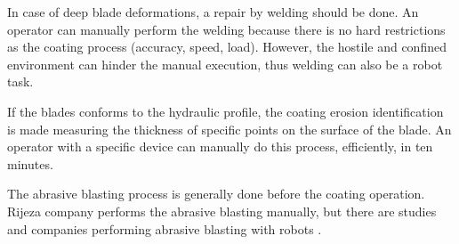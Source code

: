 In case of deep blade deformations, %
a repair by welding should be done. %
An operator can manually perform the welding because there is no hard
restrictions as the coating process (accuracy, speed, load). However, the
hostile and confined environment can hinder the manual execution, thus welding
can also be a robot task.

If the blades conforms to the hydraulic profile, the coating erosion
identification is made measuring the thickness of specific points on the
surface of the blade. An operator with a specific device can manually do this
process, efficiently, in ten minutes. %

The abrasive blasting process is generally done before the coating
operation. %
Rijeza company performs the abrasive blasting manually, but there are studies
and companies performing abrasive blasting with robots \citep{ren2008path}.



